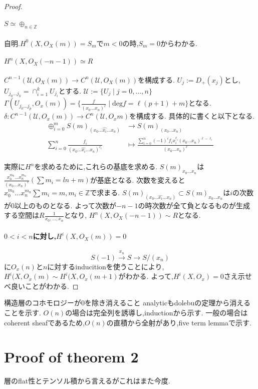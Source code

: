 \begin{proof}
\paragraph{$S \simeq \oplus_{n \in \mathbb{Z}}$}
自明.$H^0(X, O_X(m)) = S_m$で$m < 0$の時,$S_m =0$からわかる.
\paragraph{$H^n(X, O_X(-n-1)) \simeq R$}
$C^{n-1}(\mathcal{U}, O_X(m)) \to C^n(\mathcal{U}, O_X(m))$を構成する.
$U_j:= D_+(x_j)$とし,$U_{j_0\ldots j_k} = \cap_{i=1}^k U_{j_i}$とする.
$\mathcal{U}:= \{U_j \mid j=0, \ldots, n\}$
$\Gamma(U_{j_0 \ldots j_p}, O_x(m)) = \{\frac{f}{(x_0\ldots x_n)^{\ell}} \mid \mathrm{deg}f = \ell(p+1) +m\}$となる.
$ \delta: C^{n-1}(\mathcal{U}, O_x(m)) \to C^n(\mathcal{U}, O_xm)$を構成する.
具体的に書くと以下となる.
\begin{align*}
  \oplus_{i=0}^m S(m)_{(x_0 \ldots \hat{x_i} \ldots x_n)} & \to S(m)_{(x_0\ldots x_n)} \\
  \sum_{i=0}^n \frac{f_i}{(x_0 \ldots \hat{x_i} \ldots x_n)^{\ell_i}} &\mapsto \frac{\sum_{i=0}^n (-1)^i f_i x_i^{\ell_i}(x_0 \ldots x_n)^{\ell - \ell_i}}{(x_0 \ldots x_n)^{\ell}}
\end{align*}

実際に$H^n$を求めるために,これらの基底を求める.
$S(m)_{x_0 \ldots x_n}$は$\frac{x_0^{m_0}\ldots x_n^{m_n}}{(x_0 \ldots x_n)^{\ell}}(\sum m_i = ln + m)$が基底となる.
次数を変えると$x_0^{m_0}\ldots x_n^{m_n} \sum m_i =m, m_i \in \mathbb{Z}$で求まる.
$S(m)_{(x_0 \ldots \hat{x_i} \ldots x_n)} \subset S(m)_{x_0 \ldots x_n}$は$i$の次数が$0$以上のものとなる.
よって次数が$-n-1$の時次数が全て負となるものが生成する空間は$R \frac{1}{x_0,\dots,x_n}$となり,
$H^n(X, O_X(-n-1)) \sim R$となる.

\paragraph{$0 < i < n$に対し,$H^i(X, O_X(m)) = 0$}
\begin{equation*}
    S(-1) \xrightarrow{x_n} S \to S/(x_n)
\end{equation*}
に$O_x(n)$と$n$に対するinducitionを使うことにより,
$H^i(X, O_x(m) \sim H^i(X, O_x(m+1)$がわかる.
よって,$H^i(X, O_x)=0$さえ示せべ良いことがわかる.

\end{proof}
構造層のコホモロジーが$0$を除き消えること
analyticもdolebuの定理から消えることを示す.
$O(n)$の場合は完全列を誘導し,inductionから示す.
一般の場合はcoherent sheafであるため,$O(n)$の直積から全射があり,five term lemmaで示す.

\section{Proof of theorem 2}
層のflat性とテンソル積から言えるがこれはまた今度.
